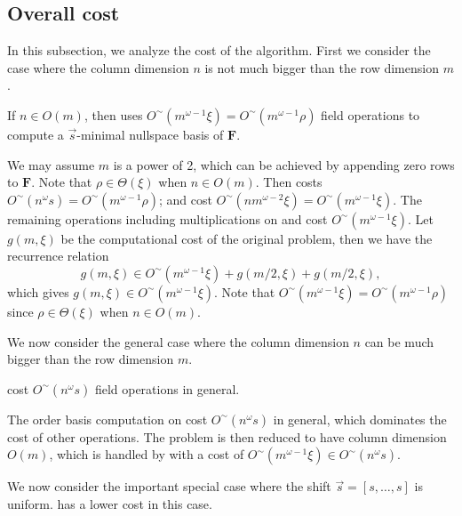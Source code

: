 


\subsection{Overall cost}

In this subsection, we analyze the cost of the algorithm. First we
consider the case where the column dimension $n$ is not much bigger
than the row dimension $m$. 
\begin{lem}
\label{lem:costLowColDimension}If $n\in O\left(m\right)$, then 
uses $O^{\sim}\left(m^{\omega-1}\xi\right)=O^{\sim}\left(m^{\omega-1}\rho\right)$
field operations to compute a $\vec{s}$-minimal nullspace basis of
$\mathbf{F}$.\end{lem}
\begin{pf}
We may assume $m$ is a power of 2, which can be achieved by appending
zero rows to $\mathbf{F}$. Note that $\rho\in\Theta\left(\xi\right)$
when $n\in O\left(m\right)$. Then  costs
$O^{\sim}\left(n^{\omega}s\right)=O^{\sim}\left(m^{\omega-1}\rho\right)$;
 and  cost
$O^{\sim}\left(nm^{\omega-2}\xi\right)=O^{\sim}\left(m^{\omega-1}\xi\right)$.
The remaining operations including multiplications on 
and  cost $O^{\sim}\left(m^{\omega-1}\xi\right)$.
Let $g(m,\xi)$ be the computational cost of the original problem,
then we have the recurrence relation 
\[
g(m,\xi)\in O^{\sim}(m^{\omega-1}\xi)+g(m/2,\xi)+g(m/2,\xi),
\]
 which gives $g(m,\xi)\in O^{\sim}(m^{\omega-1}\xi)$. Note that $O^{\sim}\left(m^{\omega-1}\xi\right)=O^{\sim}\left(m^{\omega-1}\rho\right)$
since $\rho\in\Theta\left(\xi\right)$ when $n\in O\left(m\right)$.
\end{pf}
We now consider the general case where the column dimension $n$ can
be much bigger than the row dimension $m$.
\begin{lem}
\label{lem:costGeneral} cost
$O^{\sim}\left(n^{\omega}s\right)$ field operations in general.\end{lem}
\begin{pf}
The order basis computation on  cost $O^{\sim}\left(n^{\omega}s\right)$
in general, which dominates the cost of other operations. The problem
is then reduced to have column dimension $O\left(m\right)$, which
is handled by  with a cost of
$O^{\sim}\left(m^{\omega-1}\xi\right)\in O^{\sim}\left(n^{\omega}s\right)$.
\end{pf}
We now consider the important special case where the shift $\vec{s}=\left[s,\dots,s\right]$
is uniform.  has a lower cost
in this case.

